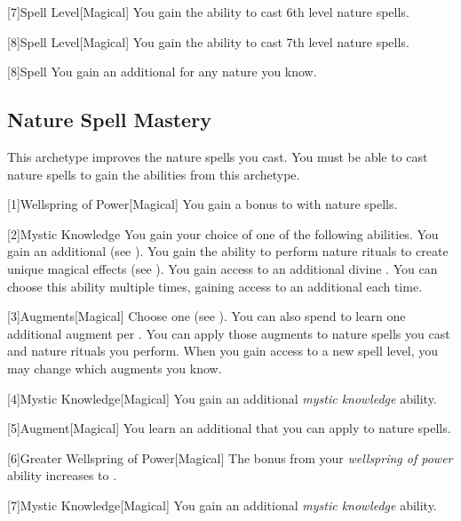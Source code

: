         [7]{Spell Level}[Magical] You gain the ability to cast 6th level nature spells.

        [8]{Spell Level}[Magical] You gain the ability to cast 7th level nature spells.

        [8]{Spell} You gain an additional  for any nature  you know.

    \subsection{Nature Spell Mastery}
        This archetype improves the nature spells you cast.
        You must be able to cast nature spells to gain the abilities from this archetype.

        [1]{Wellspring of Power}[Magical]
        You gain a  bonus to  with nature spells.

        [2]{Mystic Knowledge}
        You gain your choice of one of the following abilities.
        {
             You gain an additional  (see ).
             You gain the ability to perform nature rituals to create unique magical effects (see ).
             You gain access to an additional divine .
                You can choose this ability multiple times, gaining access to an additional  each time.
        }

        [3]{Augments}[Magical]
        Choose one  (see ).
        You can also spend  to learn one additional augment per .
        You can apply those augments to nature spells you cast and nature rituals you perform.
        When you gain access to a new spell level, you may change which augments you know.

        [4]{Mystic Knowledge}[Magical]
        You gain an additional \textit{mystic knowledge} ability.

        [5]{Augment}[Magical]
        You learn an additional  that you can apply to nature spells.

        [6]{Greater Wellspring of Power}[Magical]
        The bonus from your \textit{wellspring of power} ability increases to .

        [7]{Mystic Knowledge}[Magical]
        You gain an additional \textit{mystic knowledge} ability.


